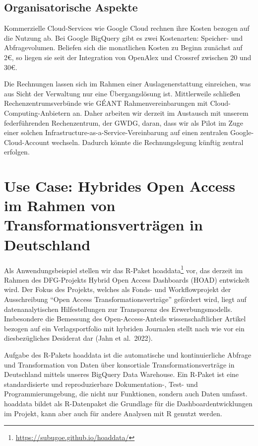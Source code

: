 \documentclass[a4paper,
fontsize=11pt,
oneside,
numbers=noperiodatend,
parskip=half-,
bibliography=totoc,
final
]{scrartcl}
\begin{document}
\hypertarget{organisatorische-aspekte}{%
\subsection{Organisatorische Aspekte}\label{organisatorische-aspekte}}

Kommerzielle Cloud-Services wie Google Cloud rechnen ihre Kosten bezogen
auf die Nutzung ab. Bei Google BigQuery gibt es zwei Kostenarten:
Speicher- und Abfragevolumen. Beliefen sich die monatlichen Kosten zu
Beginn zunächst auf 2€, so liegen sie seit der Integration von OpenAlex
und Crossref zwischen 20 und 30€.

Die Rechnungen lassen sich im Rahmen einer Auslagenerstattung
einreichen, was aus Sicht der Verwaltung nur eine Übergangslösung ist.
Mittlerweile schließen Rechenzentrumsverbünde wie GÉANT
Rahmenvereinbarungen mit Cloud-Computing-Anbietern an. Daher arbeiten
wir derzeit im Austausch mit unserem federführenden Rechenzentrum, der
GWDG, daran, dass wir als Pilot im Zuge einer solchen
Infrastructure-as-a-Service-Vereinbarung auf einen zentralen
Google-Cloud-Account wechseln. Dadurch könnte die Rechnungslegung
künftig zentral erfolgen.

\hypertarget{use-case-hybrides-open-access-im-rahmen-von-transformationsvertruxe4gen-in-deutschland}{%
\section{Use Case: Hybrides Open Access im Rahmen von
Transformationsverträgen in
Deutschland}\label{use-case-hybrides-open-access-im-rahmen-von-transformationsvertruxe4gen-in-deutschland}}

Als Anwendungsbeispiel stellen wir das R-Paket hoaddata\footnote{\url{https://subugoe.github.io/hoaddata/}}
vor, das derzeit im Rahmen des DFG-Projekts Hybrid Open Access
Dashboards (HOAD) entwickelt wird. Der Fokus des Projekts, welches als
Fonds- und Workflowprojekt der Ausschreibung \enquote{Open Access
Transformationsverträge} gefördert wird, liegt auf datenanalytischen
Hilfestellungen zur Transparenz des Erwerbungsmodells. Insbesondere die
Bemessung des Open-Access-Anteils wissenschaftlicher Artikel bezogen auf
ein Verlagsportfolio mit hybriden Journalen stellt nach wie vor ein
diesbezügliches Desiderat dar (Jahn et al.~2022).

Aufgabe des R-Pakets hoaddata ist die automatische und kontinuierliche
Abfrage und Transformation von Daten über konsortiale
Transformationsverträge in Deutschland mittels unseres BigQuery Data
Warehouse. Ein R-Paket ist eine standardisierte und reproduzierbare
Dokumentation-, Test- und Programmierumgebung, die nicht nur Funktionen,
sondern auch Daten umfasst. hoaddata bildet als R-Datenpaket die
Grundlage für die Dashboardentwicklungen im Projekt, kann aber auch für
andere Analysen mit R genutzt werden.
\end{document}
